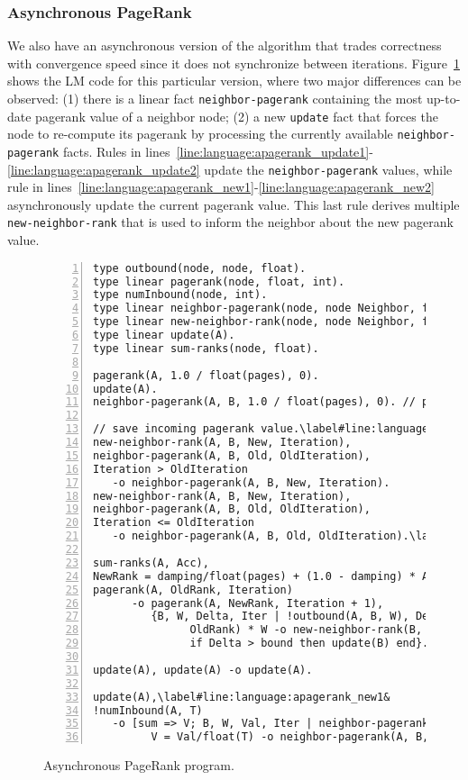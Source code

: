 \subsubsection{Asynchronous PageRank}

We also have an asynchronous version of the algorithm that trades correctness
with convergence speed since it does not synchronize between iterations.
Figure~\ref{language:code:async_pagerank} shows the LM code for this particular
version, where two major differences can be observed: (1) there is a linear fact
\texttt{neighbor-pagerank} containing the most up-to-date pagerank value of a
neighbor node; (2) a new \texttt{update} fact that forces the node to re-compute
its pagerank by processing the currently available \texttt{neighbor-pagerank}
facts. Rules in
lines~\ref{line:language:apagerank_update1}-\ref{line:language:apagerank_update2}
update the \texttt{neighbor-pagerank} values, while rule in
lines~\ref{line:language:apagerank_new1}-\ref{line:language:apagerank_new2}
asynchronously update the current pagerank value. This last rule derives
multiple \texttt{new-neighbor-rank} that is used to inform the neighbor about
the new pagerank value.

\begin{figure}[h!]
\begin{Verbatim}[numbers=left,fontsize=\codesize,commandchars=\\\#\&]
type outbound(node, node, float).
type linear pagerank(node, float, int).
type numInbound(node, int).
type linear neighbor-pagerank(node, node Neighbor, float Rank, int Iteration).
type linear new-neighbor-rank(node, node Neighbor, float Rank, int Iteration).
type linear update(A).
type linear sum-ranks(node, float).

pagerank(A, 1.0 / float(pages), 0).
update(A).
neighbor-pagerank(A, B, 1.0 / float(pages), 0). // pagerank of B is ...

// save incoming pagerank value.\label#line:language:apagerank_update1&
new-neighbor-rank(A, B, New, Iteration),
neighbor-pagerank(A, B, Old, OldIteration),
Iteration > OldIteration
   -o neighbor-pagerank(A, B, New, Iteration).
new-neighbor-rank(A, B, New, Iteration),
neighbor-pagerank(A, B, Old, OldIteration),
Iteration <= OldIteration
   -o neighbor-pagerank(A, B, Old, OldIteration).\label#line:language:apagerank_update2&

sum-ranks(A, Acc),
NewRank = damping/float(pages) + (1.0 - damping) * Acc,
pagerank(A, OldRank, Iteration)
      -o pagerank(A, NewRank, Iteration + 1),
         {B, W, Delta, Iter | !outbound(A, B, W), Delta = fabs(NewRank -
               OldRank) * W -o new-neighbor-rank(B, A, NewRank, Iteration + 1),
               if Delta > bound then update(B) end}.

update(A), update(A) -o update(A).

update(A),\label#line:language:apagerank_new1&
!numInbound(A, T)
   -o [sum => V; B, W, Val, Iter | neighbor-pagerank(A, B, Val, Iter),
         V = Val/float(T) -o neighbor-pagerank(A, B, Val, Iter) -> sum-ranks(A, V)].\label#line:language:apagerank_new2&
\end{Verbatim}
\caption{Asynchronous PageRank program.}
\label{language:code:async_pagerank}
\end{figure}

